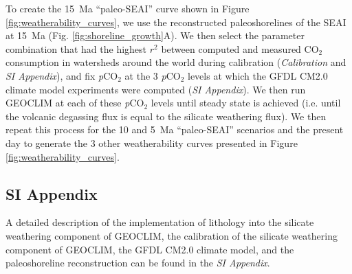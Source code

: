 \documentclass[9pt,twocolumn,twoside,lineno]{pnas-new}
\newcommand{\pCOtwo}{\textit{p}CO$_{2}$\xspace}
\newcommand{\COtwo}{CO$_{2}$\xspace}
\newcommand{\SI}{\textit{SI Appendix}\xspace}
\begin{document}
{To create the 15~Ma ``paleo-SEAI'' curve shown in Figure \ref{fig:weatherability_curves}, we use the reconstructed paleoshorelines of the SEAI at 15~Ma (Fig. \ref{fig:shoreline_growth}A). We then select the parameter combination that had the highest $r^{2}$ between computed and measured \COtwo consumption in watersheds around the world during calibration (\textit{Calibration} and \SI), and fix \pCOtwo at the 3 \pCOtwo levels at which the GFDL CM2.0 climate model experiments were computed (\SI). We then run GEOCLIM at each of these \pCOtwo levels until steady state is achieved (i.e. until the volcanic degassing flux is equal to the silicate weathering flux). We then repeat this process for the 10 and 5~Ma ``paleo-SEAI'' scenarios and the present day to generate the 3 other weatherability curves presented in Figure \ref{fig:weatherability_curves}. 

\subsection*{SI Appendix}

A detailed description of the implementation of lithology into the silicate weathering component of GEOCLIM, the calibration of the silicate weathering component of GEOCLIM, the GFDL CM2.0 climate model, and the paleoshoreline reconstruction can be found in the \SI.
}

\showmatmethods{} %


\showacknow{} %


\end{document}
